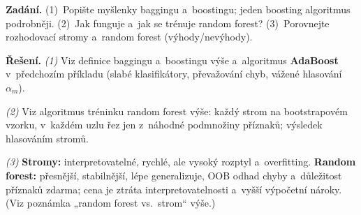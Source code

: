 \begin{priklad}
\par
\textbf{Zadání.} (1)~Popište myšlenky baggingu a~boostingu; jeden boosting algoritmus podrobněji. (2)~Jak funguje a~jak se trénuje random forest? (3)~Porovnejte rozhodovací stromy a~random forest (výhody/nevýhody).

\smallskip
\textbf{Řešení.}
\emph{(1)} Viz definice baggingu a~boostingu výše a~algoritmus \textbf{AdaBoost} v~předchozím příkladu (slabé klasifikátory, převažování chyb, vážené hlasování $\alpha_m$).

\emph{(2)} Viz algoritmus tréninku random forest výše: každý strom na bootstrapovém vzorku, v~každém uzlu řez jen z~náhodné podmnožiny příznaků; výsledek hlasováním stromů.

\emph{(3)} \textbf{Stromy:} interpretovatelné, rychlé, ale vysoký rozptyl a~overfitting. \textbf{Random forest:} přesnější, stabilnější, lépe generalizuje, OOB odhad chyby a~důležitost příznaků zdarma; cena je ztráta interpretovatelnosti a~vyšší výpočetní nároky. (Viz poznámka „random forest vs.\ strom`` výše.)
\end{priklad}

